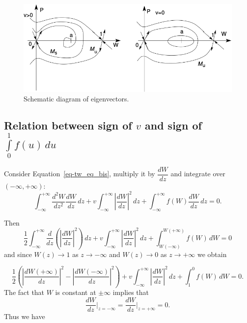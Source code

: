\documentclass[
  letterpaper,
  DIV=11,
  numbers=noendperiod]{scrreprt}
\theoremstyle{definition}
\theoremstyle{plain}
\theoremstyle{plain}
\theoremstyle{remark}
\begin{document}
\begin{figure}

{\centering \includegraphics{fig3.png}

}

\caption{\label{fig-eigenvectorsbistable}Schematic diagram of
eigenvectors.}

\end{figure}

\hypertarget{relation-between-sign-of-v-and-sign-of-intlimits_01-fu-du}{%
\subsection{\texorpdfstring{Relation between sign of \(v\) and sign of
\(\int\limits_0^1 f(u) \, du\)}{Relation between sign of v and sign of \textbackslash int\textbackslash limits\_0\^{}1 f(u) \textbackslash, du}}\label{relation-between-sign-of-v-and-sign-of-intlimits_01-fu-du}}

Consider Equation~\ref{eq-tw_eq_bis}, multiply it by \(\dfrac{dW}{dz}\)
and integrate over \((-\infty, + \infty)\): \[
\int_{-\infty}^{+ \infty}  \dfrac{d^2W}{dz^2} \dfrac{dW}{dz} \, dz + v\int_{-\infty}^{+ \infty} \left|\dfrac{dW}{dz} \right|^2\, dz  + \int_{-\infty}^{+ \infty}f(W)\dfrac{dW}{dz} \, dz =0.
\]

Then \[
\frac 12 \int_{-\infty}^{+ \infty}  \dfrac{d}{dz} \left(\left|\dfrac{dW}{dz}\right |^2\right) \, dz + v\int_{-\infty}^{+ \infty} \left|\dfrac{dW}{dz} \right|^2\, dz  + \int_{W(-\infty)}^{W(+\infty)}f(W) \, dW =0
\] and since \(W(z) \to 1\) as \(z \to - \infty\) and \(W(z) \to 0\) as
\(z \to + \infty\) we obtain

\[
\frac 12 \left( \left|\dfrac{dW(+\infty)}{dz}\right |^2-   \left|\dfrac{dW(-\infty)}{dz}\right |^2\right)  + v\int_{-\infty}^{+ \infty} \left|\dfrac{dW}{dz} \right|^2\, dz  + \int_{1}^{0}f(W) \, dW =0.
\] The fact that \(W\) is constant at \(\pm \infty\) implies that \[
\dfrac{dW}{dz}\Big|_{z=-\infty} = \dfrac{dW}{dz}\Big|_{z=+\infty}=0.
\] Thus we have
\end{document}
